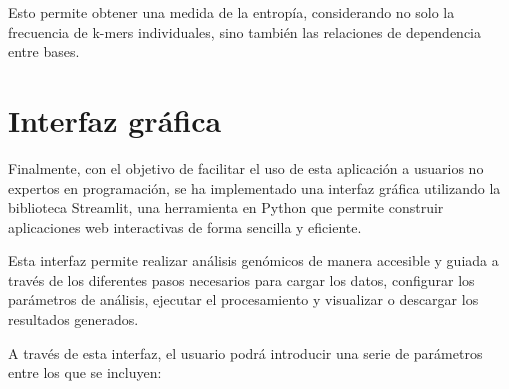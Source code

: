 \documentclass[11pt,spanish,listoffigures,listoftables]{tfgetsinf}
\begin{document}
Esto permite obtener una medida de la entropía, considerando no solo la frecuencia de k-mers individuales, sino también las relaciones de dependencia entre bases. 

\section{Interfaz gráfica}

Finalmente, con el objetivo de facilitar el uso de esta aplicación a usuarios no expertos en programación, se ha implementado una interfaz gráfica utilizando la biblioteca Streamlit, una herramienta en Python que permite construir aplicaciones web interactivas de forma sencilla y eficiente. 

Esta interfaz permite realizar análisis genómicos de manera accesible y guiada a través de los diferentes pasos necesarios para cargar los datos, configurar los parámetros de análisis, ejecutar el procesamiento y visualizar o descargar los resultados generados. 

 

A través de esta interfaz, el usuario podrá introducir una serie de parámetros entre los que se incluyen:  
\end{document}

